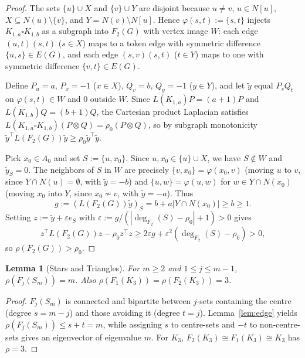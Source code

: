 \documentclass[11pt]{article}
\newtheorem{lemma}[theorem]{Lemma}
\begin{document}
\begin{proof}
The sets $\{u\} \cup X$ and $\{v\} \cup Y$ are disjoint because $u \neq v$,
$u \in N[u]$, $X \subseteq N(u) \setminus \{v\}$, and $Y = N(v) \setminus N[u]$.
Hence $\varphi(s, t) := \{s, t\}$ injects $K_{1, a} \square K_{1, b}$ as a
subgraph into $F_2(G)$ with vertex image $W$: each edge $(u, t)(s, t)$
($s \in X$) maps to a token edge with symmetric difference $\{u, s\} \in E(G)$,
and each edge $(s, v)(s, t)$ ($t \in Y$) maps to one with symmetric difference
$\{v, t\} \in E(G)$.

Define $P_u = a$, $P_x = -1$ ($x \in X$), $Q_v = b$, $Q_y = -1$ ($y \in Y$),
and let $\tilde{y}$ equal $P_s Q_t$ on $\varphi(s, t) \in W$ and $0$ outside
$W$. Since $L(K_{1, a})P = (a + 1)P$ and $L(K_{1, b})Q = (b + 1)Q$, the
Cartesian product Laplacian satisfies
$L(K_{1, a} \square K_{1, b})(P \otimes Q) = \rho_0 (P \otimes Q)$, so by
subgraph monotonicity $\tilde{y}^\top L(F_2(G)) \tilde{y} \ge \rho_0 \tilde{y}^\top \tilde{y}$.

Pick $x_0 \in A_0$ and set $S := \{u, x_0\}$. Since $u, x_0 \in \{u\} \cup X$,
we have $S \notin W$ and $\tilde{y}_S = 0$. The neighbors of $S$ in $W$ are
precisely $\{v, x_0\} = \varphi(x_0, v)$ (moving $u$ to $v$, since
$Y \cap N(u) = \emptyset$, with $\tilde{y} = -b$) and $\{u, w\} = \varphi(u, w)$
for $w \in Y \cap N(x_0)$ (moving $x_0$ into $Y$, since $x_0 \not\sim v$, with
$\tilde{y} = -a$). Thus
\[
g := (L(F_2(G))\tilde{y})_S = b + a|Y \cap N(x_0)| \ge b \ge 1.
\]
Setting $z := \tilde{y} + \varepsilon e_S$ with
$\varepsilon := g / (|\deg_{F_2}(S) - \rho_0| + 1) > 0$ gives
\[
z^\top L(F_2(G)) z - \rho_0 z^\top z
\ge 2\varepsilon g + \varepsilon^2 (\deg_{F_2}(S) - \rho_0) > 0,
\]
so $\rho(F_2(G)) > \rho_0$.
\end{proof}

\begin{lemma}[Stars and Triangles]\label{lem:stars}
For $m \ge 2$ and $1 \le j \le m - 1$, $\rho(F_j(S_m)) = m$. Also
$\rho(F_1(K_3)) = \rho(F_2(K_3)) = 3$.
\end{lemma}

\begin{proof}
$F_j(S_m)$ is connected and bipartite between $j$-sets containing the centre
(degree $s = m - j$) and those avoiding it (degree $t = j$). Lemma~\ref{lem:edge}
yields $\rho(F_j(S_m)) \le s + t = m$, while assigning $s$ to centre-sets and
$-t$ to non-centre-sets gives an eigenvector of eigenvalue $m$. For $K_3$,
$F_2(K_3) \cong F_1(K_3) \cong K_3$ has $\rho = 3$.
\end{proof}
\end{document}
